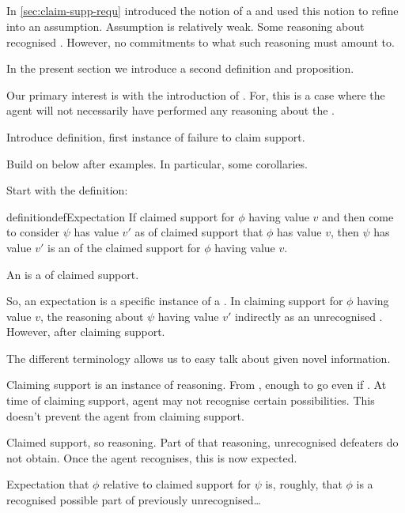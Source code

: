 \subsection{}
\label{sec:claim-supp-expect}
\label{sec:claim-supp-nai}

\begin{note}
  In \autoref{sec:claim-supp-requ} introduced the notion of a \requ{} and used this notion to refine \ideaCSB{} into an assumption.
  Assumption is relatively weak.
  Some reasoning about recognised .
  However, no commitments to what such reasoning must amount to.

  In the present section we introduce a second definition and proposition.
\end{note}

\begin{note}
  Our primary interest is with the introduction of .
  For, this is a case where the agent will not necessarily have performed any reasoning about the \requ{}.

  Introduce definition, first instance of failure to claim support.

  Build on below after examples.
  In particular, some corollaries.
\end{note}

\begin{note}
  Start with the definition:

  \begin{restatable}{definition}{defExpectation}\label{def:expectation}
    If claimed support for \(\phi\) having value \(v\) and then come to consider \(\psi\) has value \(v'\) as \requ{} of claimed support that \(\phi\) has value \(v\), then \(\psi\) has value \(v'\) is an \emph{\expec{}} of the claimed support for \(\phi\) having value \(v\).
  \end{restatable}

  An \expec{} is a \requ{} of claimed support.

  So, an expectation is a specific instance of a \requ{}.
  In claiming support for \(\phi\) having value \(v\), the reasoning about \(\psi\) having value \(v'\) indirectly as an unrecognised \requ{}.
  However, after claiming support.

  The different terminology allows us to easy talk about  given novel information.
\end{note}

\begin{note}
  Claiming support is an instance of reasoning.
  From \eiS{}, enough to go even if \mom{}.
  At time of claiming support, agent may not recognise certain possibilities.
  This doesn't prevent the agent from claiming support.

  Claimed support, so reasoning.
  Part of that reasoning, unrecognised defeaters do not obtain.
  Once the agent recognises, this is now expected.

  Expectation that \(\phi\) relative to claimed support for \(\psi\) is, roughly, that \(\phi\) is a recognised possible part of previously unrecognised\dots
\end{note}

